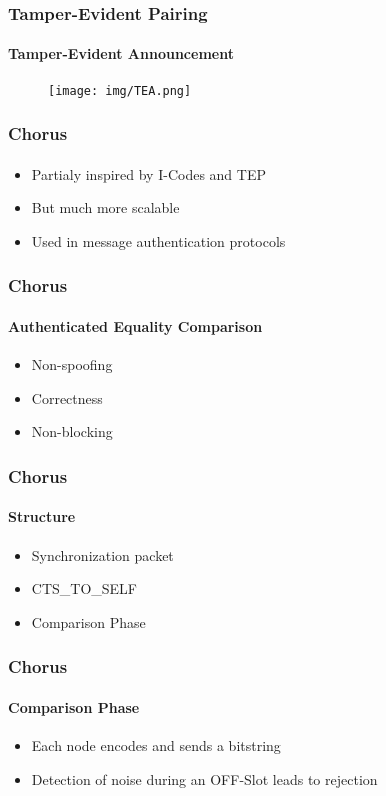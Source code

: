 \documentclass{beamer}
\begin{document}
\begin{frame}
	\frametitle{Tamper-Evident Pairing}
	\framesubtitle{Tamper-Evident Announcement}
	\begin{figure}
		\centering
		\texttt{[image: img/TEA.png]}
	\end{figure}
\end{frame}

\begin{frame}
	\frametitle{Chorus}
	\framesubtitle{}
	\begin{itemize}
		\item Partialy inspired by I-Codes and TEP
		\item But much more scalable
		\item Used in message authentication protocols 
	\end{itemize}
\end{frame}

\begin{frame}
	\frametitle{Chorus}
	\framesubtitle{Authenticated Equality Comparison}
	\begin{itemize}
		\item Non-spoofing 
		\item Correctness
		\item Non-blocking
	\end{itemize}
\end{frame}

\begin{frame}
	\frametitle{Chorus}
	\framesubtitle{Structure}
	\begin{itemize}
		\item Synchronization packet 
		\item CTS\_TO\_SELF
		\item Comparison Phase
	\end{itemize}
\end{frame}

\begin{frame}
	\frametitle{Chorus}
	\framesubtitle{Comparison Phase}
	\begin{itemize}
		\item Each node encodes and sends a bitstring 
		\item Detection of noise during an OFF-Slot leads to rejection 
	\end{itemize}
\end{frame}

\end{document}
